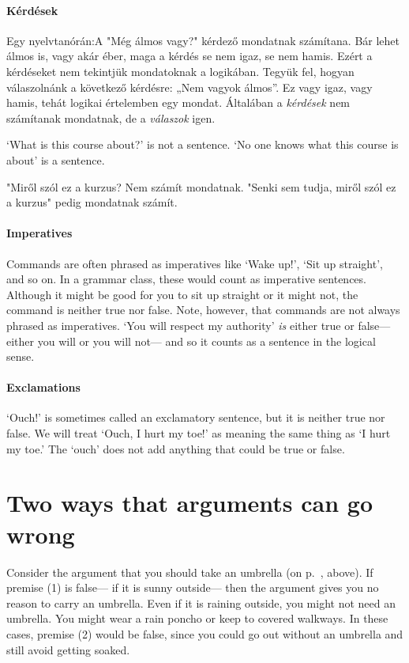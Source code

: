 \paragraph{Kérdések} Egy nyelvtanórán:A "Még álmos vagy?" kérdező mondatnak számítana. Bár lehet álmos is, vagy akár éber, maga a kérdés se nem igaz, se nem hamis. Ezért a kérdéseket nem tekintjük  mondatoknak  a logikában. Tegyük fel, hogyan válaszolnánk a következő kérdésre: „Nem vagyok álmos”. Ez vagy igaz, vagy hamis, tehát logikai értelemben egy mondat. Általában a \emph {kérdések} nem számítanak mondatnak, de a \emph {válaszok} igen.


`What is this course about?' is not a sentence. `No one knows what this course is about' is a sentence.



"Miről szól ez a kurzus? Nem számít mondatnak. "Senki sem tudja, miről szól ez a kurzus" pedig mondatnak számít.



\paragraph{Imperatives} Commands are often phrased as imperatives like `Wake up!', `Sit up straight', and so on. In a grammar class, these would count as imperative sentences. Although it might be good for you to sit up straight or it might not, the command is neither true nor false. Note, however, that commands are not always phrased as imperatives. `You will respect my authority' \emph{is} either true or false--- either you will or you will not--- and so it counts as a sentence in the logical sense.

\paragraph{Exclamations} `Ouch!' is sometimes called an exclamatory sentence, but it is neither true nor false. We will treat `Ouch, I hurt my toe!' as meaning the same thing as `I hurt my toe.' The `ouch' does not add anything that could be true or false.




\section{Two ways that arguments can go wrong}
Consider the argument that you should take an umbrella (on p.~\pageref{argRaining}, above). If premise (1) is false--- if it is sunny outside--- then the argument gives you no reason to carry an umbrella. Even if it is raining outside, you might not need an umbrella. You might wear a rain poncho or keep to covered walkways. In these cases, premise (2) would be false, since you could go out without an umbrella and still avoid getting soaked.

